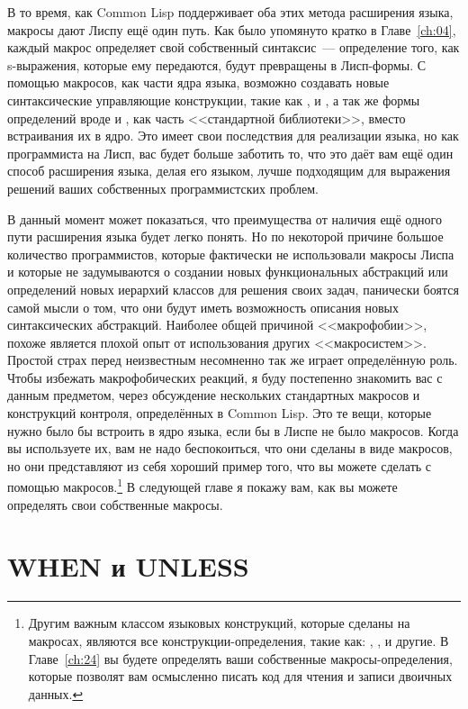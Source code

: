 В то время, как Common Lisp поддерживает оба этих метода расширения языка, макросы дают
Лиспу ещё один путь.  Как было упомянуто кратко в Главе~\ref{ch:04}, каждый макрос определяет свой
собственный синтаксис~--- определение того, как s-выражения, которые ему передаются, будут
превращены в Лисп-формы. С помощью макросов, как части ядра языка, возможно создавать
новые синтаксические управляющие конструкции, такие как ,  и
, а так же формы определений вроде  и , как
часть <<стандартной библиотеки>>, вместо встраивания их в ядро. Это имеет свои последствия
для реализации языка, но как программиста на Лисп, вас будет больше заботить то, что это
даёт вам ещё один способ расширения языка, делая его языком, лучше подходящим для
выражения решений ваших собственных программистских проблем.

В данный момент может показаться, что преимущества от наличия ещё одного пути расширения
языка будет легко понять. Но по некоторой причине большое количество программистов,
которые фактически не использовали макросы Лиспа и которые не задумываются о создании
новых функциональных абстракций или определений новых иерархий классов для решения своих
задач, панически боятся самой мысли о том, что они будут иметь возможность описания новых
синтаксических абстракций. Наиболее общей причиной <<макрофобии>>, похоже является плохой
опыт от использования других <<макросистем>>. Простой страх перед неизвестным несомненно так
же играет определённую роль. Чтобы избежать макрофобических реакций, я буду постепенно
знакомить вас с данным предметом, через обсуждение нескольких стандартных макросов и
конструкций контроля, определённых в Common Lisp. Это те вещи, которые нужно было бы
встроить в ядро языка, если бы в Лиспе не было макросов. Когда вы используете их, вам не
надо беспокоиться, что они сделаны в виде макросов, но они представляют из себя хороший
пример того, что вы можете сделать с помощью макросов.\footnote{Другим важным классом
  языковых конструкций, которые сделаны на макросах, являются все конструкции-определения,
  такие как: , ,  и другие. В Главе~\ref{ch:24} вы
  будете определять ваши собственные макросы-определения, которые позволят вам осмысленно
  писать код для чтения и записи двоичных данных.} В следующей главе я покажу вам, как вы
можете определять свои собственные макросы.

\section{WHEN и UNLESS}

